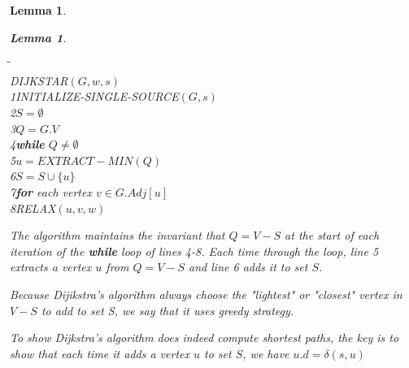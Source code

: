 \documentclass[a4paper,11pt]{book}
\newtheorem{lemma}[theorem]{Lemma}
\begin{document}
{\begin{lemma}
\begin{lemma}
\begin{tabbing}
\hspace{.8cm}\=\hspace{.8cm}\=\hspace{.8cm}\=\\
DIJKSTAR$(G,w,s)$\\
1\>INITIALIZE-SINGLE-SOURCE$(G,s)$\\
2\>$S = \emptyset$\\
3\>$Q = G.V$\\
4\>\textbf{while} $Q\neq \emptyset$\\
5\>\>$u = EXTRACT-MIN(Q)$\\
6\>\>$S = S \cup \{u\}$\\
7\>\>\textbf{for} each vertex $v \in G.Adj[u]$\\
8\>\>\>RELAX$(u,v,w)$
\end{tabbing}
The algorithm maintains the invariant that $Q = V - S$ at the start of each iteration of the \textbf{while} loop of lines 4-8. Each time through the loop, line 5 extracts a vertex $u$ from $Q = V - S$ and line 6 adds it to set $S$.

Because Dijikstra's algorithm always choose the "lightest" or "closest" vertex in $V-S$ to add to set S, we say that it uses greedy strategy. 

To show Dijkstra's algorithm does indeed compute shortest paths, the key is to show that each time it adds a vertex $u$ to set $S$, we have $u.d = \delta(s,u)$


\end{lemma}
\end{lemma}}
\end{document}
